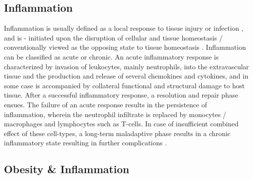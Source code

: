 




    

\subsection{Inflammation}
\label{sec:immune_inflammation}

\par Inflammation is usually defined as a local response to tissue injury or infection \textbf{\cite{donath_islet_2008}}, and is - initiated upon the disruption of cellular and tissue homeostasis / conventionally viewed as the opposing state to tissue homeostasis \textbf{\cite{meizlish_tissue_2021}}. Inflammation can be classified as acute or chronic. An acute inflammatory response is characterized by invasion of leukocytes, mainly neutrophils, into the extravascular tissue and the production and release of several chemokines and cytokines, and in some case is accompanied by collateral functional and structural damage to host tissue. After a successful inflammatory response, a resolution and repair phase ensues. The failure of an acute response results in the persistence of inflammation, wherein the neutrophil infiltrate is replaced by monocytes / macrophages and lymphocytes such as T-cells. In case of insufficient combined effect of these cell-types, a long-term maladaptive phase results in a chronic inflammatory state resulting in further complications \textbf{\cite{medzhitov_origin_2008}}. 

\subsection{Obesity \& Inflammation}
\label{sec:immune_obesity}


